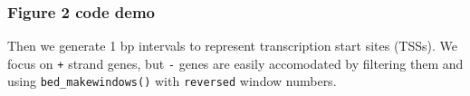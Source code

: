 \subsubsection{Figure 2 code demo}\label{figure-2-code-demo}

\begin{Shaded}
\begin{Highlighting}[]
\StringTok{ }\NormalTok{(}\NormalTok{)}
\StringTok{ }\NormalTok{(}\NormalTok{)}
\StringTok{ }\NormalTok{(}\NormalTok{)}

\StringTok{ } \NormalTok{)}
\StringTok{ }
\StringTok{ }
\end{Highlighting}
\end{Shaded}

Then we generate 1 bp intervals to represent transcription start sites
(TSSs). We focus on \texttt{+} strand genes, but \texttt{-} genes are
easily accomodated by filtering them and using
\texttt{bed\_makewindows()} with \texttt{reversed} window numbers.

